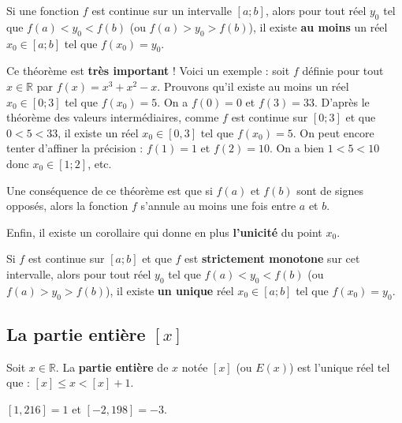 	\begin{formula}
		Si une fonction $f$ est continue sur un intervalle $[a;b]$, alors pour tout réel $y_0$ tel que $f(a) \lt y_0 \lt f(b)$ (ou $f(a) \gt y_0 \gt f(b)$), il existe \textbf{au moins} un réel $x_0 \in [a;b]$ tel que $f(x_0) = y_0$.
	\end{formula}
	
	\begin{tip}[Exemple]
		Ce théorème est \textbf{très important} ! Voici un exemple : soit $f$ définie pour tout $x \in \mathbb{R}$ par $f(x) = x^3+x^2-x$. Prouvons qu'il existe au moins un réel $x_0 \in [0;3]$ tel que $f(x_0) = 5$. On a $f(0) = 0$ et $f(3) = 33$. D'après le théorème des valeurs intermédiaires, comme $f$ est continue sur $[0;3]$ et que $0 \lt 5 \lt 33$,
		il existe un réel $x_0 \in [0,3]$ tel que $f(x_0) = 5$.
		\newpar
		On peut encore tenter d'affiner la précision : $f(1) = 1$ et $f(2) = 10$. On a bien $1 \lt 5 \lt 10$ donc $x_0 \in [1;2]$, etc.
	\end{tip}
	
	\begin{tip}
		Une conséquence de ce théorème est que si $f(a)$ et $f(b)$ sont de signes opposés, alors la fonction $f$ s'annule au moins une fois entre $a$ et $b$.
	\end{tip}
	
	Enfin, il existe un corollaire qui donne en plus \textbf{l'unicité} du point $x_0$.
	
	\begin{formula}[Corollaire]
		Si $f$ est continue sur $[a;b]$ et que $f$ est \textbf{strictement monotone} sur cet intervalle, alors pour tout réel $y_0$ tel que $f(a) \lt y_0 \lt f(b)$ (ou $f(a) \gt y_0 \gt f(b)$), il existe \textbf{un unique} réel $x_0 \in [a;b]$ tel que $f(x_0) = y_0$.
	\end{formula}
	
	\subsection{La partie entière $[x]$}
	
	\begin{formula}[Définition]
		Soit $x \in \mathbb{R}$. La \textbf{partie entière} de $x$ notée $[x]$ (ou $E(x)$) est l'unique réel tel que : $[x] \leq x \lt [x] + 1$.
	\end{formula}
	
	\begin{tip}[Exemple]
		$[1,216] = 1$ et $[-2,198] = -3$.
	\end{tip}
	
